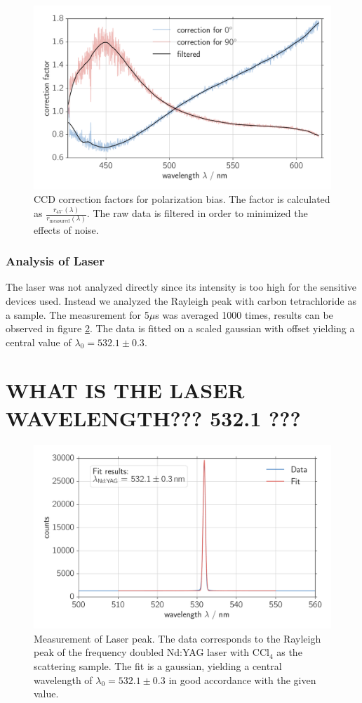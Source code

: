 \begin{figure}[htpb]
    \centering
    \includegraphics[width=0.8\linewidth]{analysis/figures/ccd_correction}
    \caption{CCD correction factors for polarization bias. The factor is calculated as 
        $\frac{r_{45^\circ}(\lambda)}{r_\text{measured}(\lambda)}$. The raw data is filtered in order to minimized 
    the effects of noise.}
    \label{fig:ccd_correction}
\end{figure}

\subsubsection{Analysis of Laser}
The laser was not analyzed directly since its intensity is too high for the sensitive devices used. Instead we 
analyzed the Rayleigh peak with carbon tetrachloride as a sample. The measurement for 5$\mu$s was averaged 1000
times, results can be observed in figure \ref{fig:ccd_laser_peak}. The data is fitted on a scaled gaussian with 
offset yielding a central value of $\lambda_0 = 532.1 \pm 0.3$. 
\section{WHAT IS THE LASER WAVELENGTH??? 532.1 ???}


\begin{figure}[htpb]
    \centering
    \includegraphics[width=0.8\linewidth]{analysis/figures/ccd_laser_peak}
    \caption{Measurement of Laser peak. The data corresponds to the Rayleigh peak of the frequency doubled Nd:YAG 
    laser with CCl$_4$ as the scattering sample. The fit is a gaussian, yielding a central wavelength of 
    $\lambda_0 = 532.1 \pm 0.3$ in good accordance with the given value. }
    \label{fig:ccd_laser_peak}
\end{figure}

